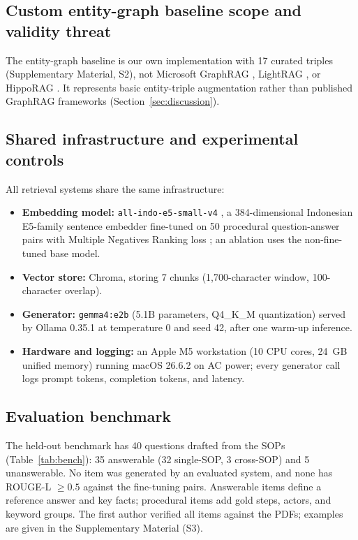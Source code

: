 \documentclass[preprint,10pt]{elsarticle}
\begin{document}
\subsection{Custom entity-graph baseline scope and validity threat}
The entity-graph baseline is our own implementation with 17 curated triples (Supplementary Material, S2), not Microsoft GraphRAG \cite{edge2024graphrag}, LightRAG \cite{guo2024lightrag}, or HippoRAG \cite{gutierrez2024hipporag}. It represents basic entity-triple augmentation rather than published GraphRAG frameworks (Section~\ref{sec:discussion}).

\subsection{Shared infrastructure and experimental controls}
All retrieval systems share the same infrastructure:
\begin{itemize}[leftmargin=*]
\item \textbf{Embedding model:} \texttt{all-indo-e5-small-v4} \cite{lazarusnlp_e5}, a 384-dimensional Indonesian E5-family \cite{wang2022e5} sentence embedder fine-tuned on 50 procedural question-answer pairs with Multiple Negatives Ranking loss \cite{henderson2017mnr}; an ablation uses the non-fine-tuned base model.
\item \textbf{Vector store:} Chroma, storing 7 chunks (1,700-character window, 100-character overlap).
\item \textbf{Generator:} \texttt{gemma4:e2b} (5.1B parameters, Q4\_K\_M quantization) served by Ollama 0.35.1 at temperature 0 and seed 42, after one warm-up inference.
\item \textbf{Hardware and logging:} an Apple M5 workstation (10 CPU cores, 24~GB unified memory) running macOS 26.6.2 on AC power; every generator call logs prompt tokens, completion tokens, and latency.
\end{itemize}

\subsection{Evaluation benchmark}
The held-out benchmark has 40 questions drafted from the SOPs (Table~\ref{tab:bench}): 35 answerable (32 single-SOP, 3 cross-SOP) and 5 unanswerable. No item was generated by an evaluated system, and none has ROUGE-L $\geq 0.5$ against the fine-tuning pairs. Answerable items define a reference answer and key facts; procedural items add gold steps, actors, and keyword groups. The first author verified all items against the PDFs; examples are given in the Supplementary Material (S3).
\end{document}

